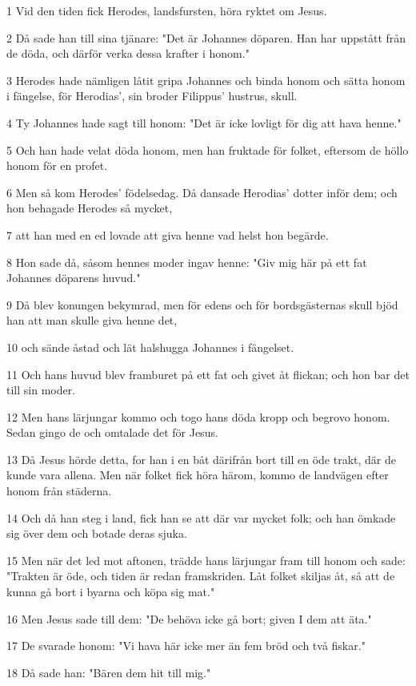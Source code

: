 \par 1 Vid den tiden fick Herodes, landsfursten, höra ryktet om Jesus.
\par 2 Då sade han till sina tjänare: "Det är Johannes döparen. Han har uppstått från de döda, och därför verka dessa krafter i honom."
\par 3 Herodes hade nämligen låtit gripa Johannes och binda honom och sätta honom i fängelse, för Herodias', sin broder Filippus' hustrus, skull.
\par 4 Ty Johannes hade sagt till honom: "Det är icke lovligt för dig att hava henne."
\par 5 Och han hade velat döda honom, men han fruktade för folket, eftersom de höllo honom för en profet.
\par 6 Men så kom Herodes' födelsedag. Då dansade Herodias' dotter inför dem; och hon behagade Herodes så mycket,
\par 7 att han med en ed lovade att giva henne vad helst hon begärde.
\par 8 Hon sade då, såsom hennes moder ingav henne: "Giv mig här på ett fat Johannes döparens huvud."
\par 9 Då blev konungen bekymrad, men för edens och för bordsgästernas skull bjöd han att man skulle giva henne det,
\par 10 och sände åstad och lät halshugga Johannes i fängelset.
\par 11 Och hans huvud blev framburet på ett fat och givet åt flickan; och hon bar det till sin moder.
\par 12 Men hans lärjungar kommo och togo hans döda kropp och begrovo honom. Sedan gingo de och omtalade det för Jesus.
\par 13 Då Jesus hörde detta, for han i en båt därifrån bort till en öde trakt, där de kunde vara allena. Men när folket fick höra härom, kommo de landvägen efter honom från städerna.
\par 14 Och då han steg i land, fick han se att där var mycket folk; och han ömkade sig över dem och botade deras sjuka.
\par 15 Men när det led mot aftonen, trädde hans lärjungar fram till honom och sade: "Trakten är öde, och tiden är redan framskriden. Låt folket skiljas åt, så att de kunna gå bort i byarna och köpa sig mat."
\par 16 Men Jesus sade till dem: "De behöva icke gå bort; given I dem att äta."
\par 17 De svarade honom: "Vi hava här icke mer än fem bröd och två fiskar."
\par 18 Då sade han: "Bären dem hit till mig."

